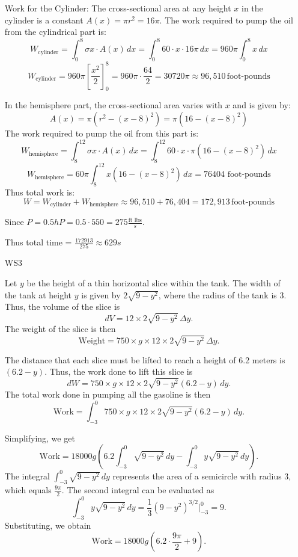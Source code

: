 \documentclass[12pt]{article}
\begin{document}
\begin{enumerate}[start=1,label={\bfseries. },leftmargin=1in]
    Work for the Cylinder:
    The cross-sectional area at any height \( x \) in the cylinder is a constant \( A(x) = \pi r^2 = 16 \pi \). The work required to pump the oil from the cylindrical part is:
    \[
    W_{\text{cylinder}} = \int_0^8 \sigma x \cdot A(x) \, dx = \int_0^8 60 \cdot x \cdot 16 \pi \, dx = 960 \pi \int_0^8 x \, dx
    \]
    \[
    W_{\text{cylinder}} = 960 \pi \left[ \frac{x^2}{2} \right]_0^8 = 960 \pi \cdot \frac{64}{2} = 30720 \pi \approx 96,510 \, \text{foot-pounds}
    \]

    In the hemisphere part, the cross-sectional area varies with \( x \) and is given by:
    \[
    A(x) = \pi \left( r^2 - (x - 8)^2 \right) = \pi \left( 16 - (x - 8)^2 \right)
    \]
    The work required to pump the oil from this part is:
    \[
    W_{\text{hemisphere}} = \int_8^{12} \sigma x \cdot A(x) \, dx = \int_8^{12} 60 \cdot x \cdot \pi (16 - (x - 8)^2) \, dx
    \]
    \[
    W_{\text{hemisphere}} = 60 \pi \int_8^{12} x (16 - (x - 8)^2) \, dx = 76404 \text{ foot-pounds}
    \]
    Thus total work is:
    \[
    W = W_{\text{cylinder}} + W_{\text{hemisphere}} \approx 96,510 + 76,404 = 172,913 \, \text{foot-pounds}
    \]

    Since $ P = 0.5 hP = 0.5 \cdot 550 = 275 \frac{\text{ft lbs}}{s}$.
    
    Thus total time = $\frac{172913}{275} \approx 629s$

\item [WS3]

Let \( y \) be the height of a thin horizontal slice within the tank. The width of the tank at height \( y \) is given by \( 2 \sqrt{9 - y^2} \), where the radius of the tank is 3. Thus, the volume of the slice is
\[
dV = 12 \times 2 \sqrt{9 - y^2} \, \Delta y.
\]
The weight of the slice is then
\[
\text{Weight} = 750 \times g \times 12 \times 2 \sqrt{9 - y^2} \, \Delta y.
\]

The distance that each slice must be lifted to reach a height of 6.2 meters is \( (6.2 - y) \). Thus, the work done to lift this slice is
\[
dW = 750 \times g \times 12 \times 2 \sqrt{9 - y^2} (6.2 - y) \, dy.
\]
The total work done in pumping all the gasoline is then
\[
\text{Work} = \int_{-3}^0 750 \times g \times 12 \times 2 \sqrt{9 - y^2} (6.2 - y) \, dy.
\]

Simplifying, we get
\[
\text{Work} = 18000 g \left( 6.2 \int_{-3}^0 \sqrt{9 - y^2} \, dy - \int_{-3}^0 y \sqrt{9 - y^2} \, dy \right).
\]
The integral \( \int_{-3}^0 \sqrt{9 - y^2} \, dy \) represents the area of a semicircle with radius 3, which equals \( \frac{9\pi}{2} \). The second integral can be evaluated as
\[
\int_{-3}^0 y \sqrt{9 - y^2} \, dy = \frac{1}{3} (9 - y^2)^{3/2} \Big|_{-3}^0 = 9.
\]
Substituting, we obtain
\[
\text{Work} = 18000 g \left( 6.2 \cdot \frac{9\pi}{2} + 9 \right).
\]


\end{enumerate}
\end{document}
